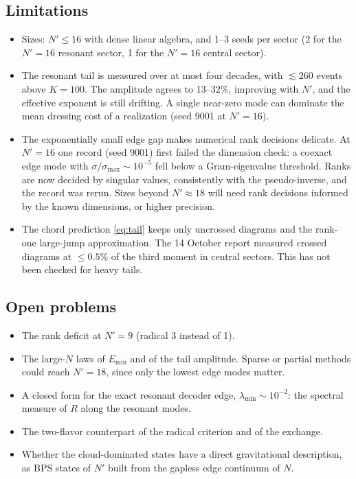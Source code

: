\documentclass[11pt]{article}
\newcommand{\Np}{N'}
\theoremstyle{plain}
\theoremstyle{remark}
\numberwithin{equation}{section}
\begin{document}
\subsection{Limitations}
\begin{itemize}\itemsep1pt
\item Sizes: $\Np\le16$ with dense linear algebra, and 1--3 seeds per sector (2 for the $\Np=16$ resonant sector,
1 for the $\Np=16$ central sector).
\item The resonant tail is measured over at most four decades, with $\lesssim260$ events above $K=100$. The amplitude
agrees to 13--32\%, improving with $\Np$, and the effective exponent is still drifting. A single near-zero mode can
dominate the mean dressing cost of a realization (seed 9001 at $\Np=16$).
\item The exponentially small edge gap makes numerical rank decisions delicate. At $\Np=16$ one record (seed 9001)
first failed the dimension check: a coexact edge mode with $\sigma/\sigma_{\max}\sim10^{-5}$ fell below a Gram-eigenvalue
threshold. Ranks are now decided by singular values, consistently with the pseudo-inverse, and the record was rerun.
Sizes beyond $\Np\approx18$ will need rank decisions informed by the known dimensions, or higher precision.
\item The chord prediction \eqref{eq:tail} keeps only uncrossed diagrams and the rank-one large-jump approximation. The
14 October report measured crossed diagrams at $\le0.5\%$ of the third moment in central sectors. This has not been
checked for heavy tails.
\end{itemize}

\subsection{Open problems}
\begin{itemize}\itemsep1pt
\item The rank deficit at $\Np=9$ (radical 3 instead of 1).
\item The large-$N$ laws of $E_{\min}$ and of the tail amplitude. Sparse or partial methods could reach $\Np=18$, since
only the lowest edge modes matter.
\item A closed form for the exact resonant decoder edge, $\lambda_{\min}\sim10^{-2}$: the spectral measure of $R$ along the
resonant modes.
\item The two-flavor counterpart of the radical criterion and of the exchange.
\item Whether the cloud-dominated states have a direct gravitational description, as BPS states of $\Np$ built from the
gapless edge continuum of $N$.
\end{itemize}
\end{document}
